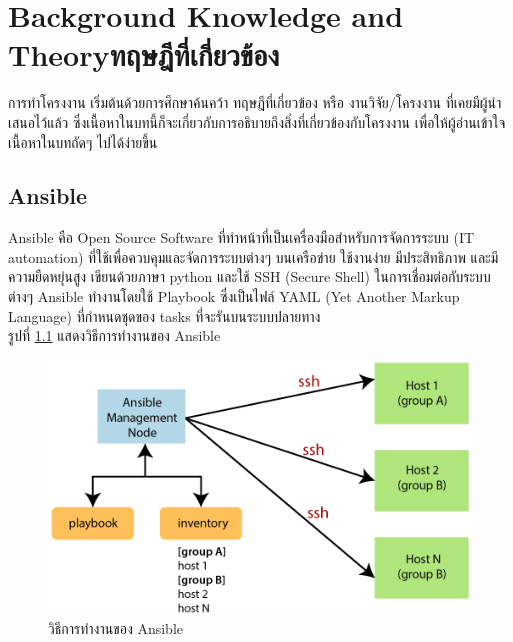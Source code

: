 \newcommand{\exinventory}{
  mail.example.com\\

  [webservers] \\
  foo.example.com \\
  bar.example.com \\
  
  [dbservers] \\
  one.example.com \\
  two.example.com \\
  three.example.com}

\chapter{\ifenglish Background Knowledge and Theory\else ทฤษฎีที่เกี่ยวข้อง\fi}

\hspace{0.5in}การทำโครงงาน เริ่มต้นด้วยการศึกษาค้นคว้า ทฤษฎีที่เกี่ยวข้อง หรือ งานวิจัย/โครงงาน ที่เคยมีผู้นำเสนอไว้แล้ว ซึ่งเนื้อหาในบทนี้ก็จะเกี่ยวกับการอธิบายถึงสิ่งที่เกี่ยวข้องกับโครงงาน เพื่อให้ผู้อ่านเข้าใจเนื้อหาในบทถัดๆ ไปได้ง่ายขึ้น

\section{Ansible}
\hspace{0.5in} Ansible คือ Open Source Software ที่ทำหน้าที่เป็นเครื่องมือสำหรับการจัดการระบบ (IT automation) ที่ใช้เพื่อควบคุมและจัดการระบบต่างๆ บนเครือข่าย ใช้งานง่าย มีประสิทธิภาพ และมีความยืดหยุ่นสูง เขียนด้วยภาษา python และใช้ SSH (Secure Shell) ในการเชื่อมต่อกับระบบต่างๆ Ansible ทำงานโดยใช้ Playbook ซึ่งเป็นไฟล์ YAML (Yet Another Markup Language) ที่กำหนดชุดของ tasks ที่จะรันบนระบบปลายทาง \\
รูปที่ \ref{fig:ansible_works} แสดงวิธีการทำงานของ Ansible

\begin{figure}
  \begin{center}
    \includegraphics[scale=0.55]{ansible-works.png}
  \end{center}
  \caption[วิธีการทำงานของ Ansible]{วิธีการทำงานของ Ansible}
  \label{fig:ansible_works}
\end{figure}

